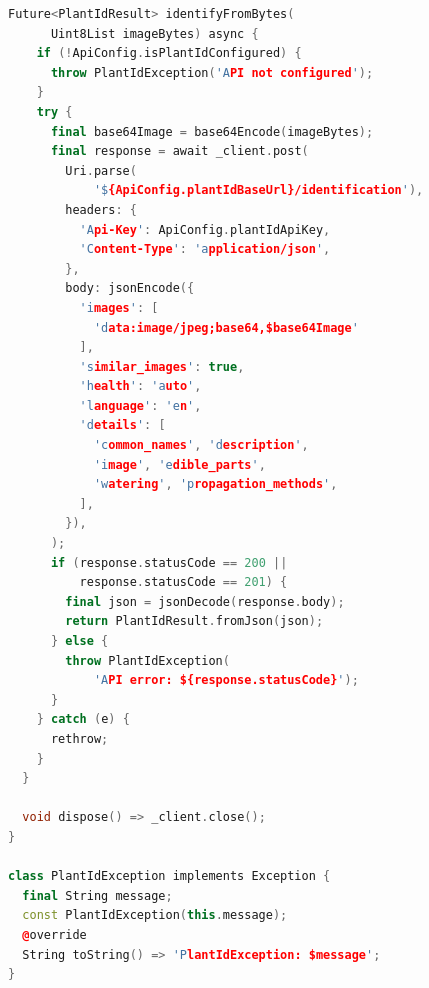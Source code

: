 \documentclass[12pt]{article}
\begin{document}
\begin{lstlisting}[language=C++]
  Future<PlantIdResult> identifyFromBytes(
      Uint8List imageBytes) async {
    if (!ApiConfig.isPlantIdConfigured) {
      throw PlantIdException('API not configured');
    }
    try {
      final base64Image = base64Encode(imageBytes);
      final response = await _client.post(
        Uri.parse(
            '${ApiConfig.plantIdBaseUrl}/identification'),
        headers: {
          'Api-Key': ApiConfig.plantIdApiKey,
          'Content-Type': 'application/json',
        },
        body: jsonEncode({
          'images': [
            'data:image/jpeg;base64,$base64Image'
          ],
          'similar_images': true,
          'health': 'auto',
          'language': 'en',
          'details': [
            'common_names', 'description',
            'image', 'edible_parts',
            'watering', 'propagation_methods',
          ],
        }),
      );
      if (response.statusCode == 200 ||
          response.statusCode == 201) {
        final json = jsonDecode(response.body);
        return PlantIdResult.fromJson(json);
      } else {
        throw PlantIdException(
            'API error: ${response.statusCode}');
      }
    } catch (e) {
      rethrow;
    }
  }

  void dispose() => _client.close();
}

class PlantIdException implements Exception {
  final String message;
  const PlantIdException(this.message);
  @override
  String toString() => 'PlantIdException: $message';
}
\end{lstlisting}

\vspace{1cm}
\end{document}
